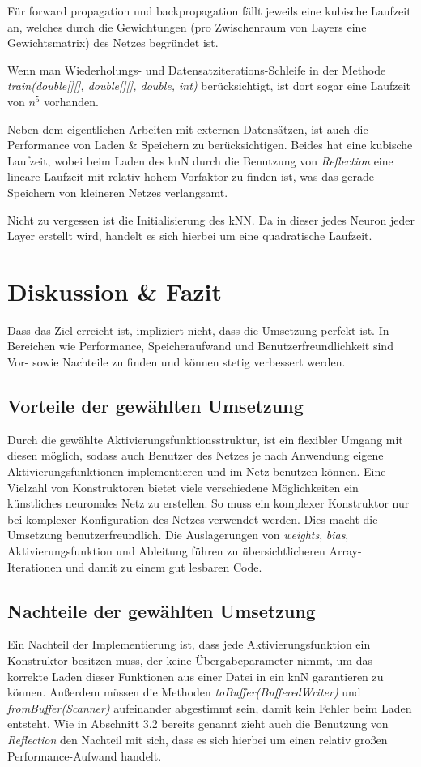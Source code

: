 \documentclass[paper=A4,pagesize=auto,12pt,headinclude=true,footinclude=true,BCOR=0mm,DIV=calc]{scrartcl}
\begin{document}
Für forward propagation und backpropagation fällt jeweils eine kubische Laufzeit an, welches durch die Gewichtungen (pro Zwischenraum von Layers eine Gewichtsmatrix) des Netzes begründet ist.

Wenn man Wiederholungs- und Datensatziterations-Schleife in der Methode \textit{train(double[][], double[][], double, int)} berücksichtigt, ist dort sogar eine Laufzeit von $n^5$ vorhanden.

Neben dem eigentlichen Arbeiten mit externen Datensätzen, ist auch die Performance von Laden  \& Speichern zu berücksichtigen. Beides hat eine kubische Laufzeit, wobei beim Laden des knN durch die Benutzung von \textit{Reflection} eine lineare Laufzeit mit relativ hohem Vorfaktor zu finden ist, was das gerade Speichern von kleineren Netzes verlangsamt.

Nicht zu vergessen ist die Initialisierung des kNN. Da in dieser jedes Neuron jeder Layer erstellt wird, handelt es sich hierbei um eine quadratische Laufzeit.



\newpage

\section{Diskussion \& Fazit}
Dass das Ziel erreicht ist, impliziert nicht, dass die Umsetzung perfekt ist. In Bereichen wie Performance, Speicheraufwand und Benutzerfreundlichkeit sind Vor- sowie Nachteile zu finden und können stetig verbessert werden.

\subsection{Vorteile der gewählten Umsetzung}
Durch die gewählte Aktivierungsfunktionsstruktur, ist ein flexibler Umgang mit diesen möglich, sodass auch Benutzer des Netzes je nach Anwendung eigene Aktivierungsfunktionen implementieren und im Netz benutzen können.
Eine Vielzahl von Konstruktoren bietet viele verschiedene Möglichkeiten ein künstliches neuronales Netz zu erstellen. So muss ein komplexer Konstruktor nur bei komplexer Konfiguration des Netzes verwendet werden.
Dies macht die Umsetzung benutzerfreundlich.
Die Auslagerungen von \textit{weights}, \textit{bias}, Aktivierungsfunktion und Ableitung führen zu übersichtlicheren Array-Iterationen und damit zu einem gut lesbaren Code.

\subsection{Nachteile der gewählten Umsetzung}
Ein Nachteil der Implementierung ist, dass jede Aktivierungsfunktion ein Konstruktor besitzen muss, der keine Übergabeparameter nimmt, um das korrekte Laden dieser Funktionen aus einer Datei in ein knN garantieren zu können. Außerdem müssen die Methoden \textit{toBuffer(BufferedWriter)} und \textit{fromBuffer(Scanner)} aufeinander abgestimmt sein, damit kein Fehler beim Laden entsteht.
Wie in Abschnitt 3.2 bereits genannt zieht auch die Benutzung von \textit{Reflection} den Nachteil mit sich, dass es sich hierbei um einen relativ großen Performance-Aufwand handelt.
\end{document}
